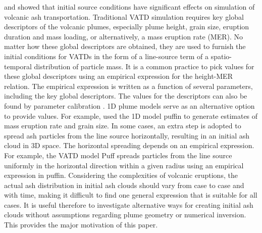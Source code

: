 \documentclass[utf8]{frontiersSCNS} %
\begin{document}
\citet{fero2009simulating} and \citet{stohl2011determination} showed that initial source conditions have significant effects on simulation of volcanic ash transportation. Traditional VATD simulation requires key global descriptors of the volcanic plumes, especially plume height, grain size, eruption duration and mass loading, or alternatively, a mass eruption rate (MER). No matter how these global descriptors are obtained, they are used to furnish the initial conditions for VATDs in the form of a line-source term of a spatio-temporal distribution of particle mass. It is a common practice to pick values for these global descriptors using an empirical expression for the height-MER relation. The empirical expression is written as a function of several parameters, including the key global descriptors. The values for the descriptors can also be found by parameter calibration \citep[e.g.][]{fero2008simulation,fero2009simulating, stohl2011determination, zidikheri2017estimation}. 1D plume models serve as an alternative option to provide values. For example, \citet{bursik2012estimation} used the 1D model puffin \citep{bursik2001effect} to generate estimates of mass eruption rate and grain size. In some cases, an extra step is adopted to spread ash particles from the line source horizontally, resulting in an initial ash cloud in 3D space. The horizontal spreading depends on an empirical expression. For example, the VATD model Puff spreads particles from the line source uniformly in the horizontal direction within a given radius using an empirical expression in puffin. Considering the complexities of volcanic eruptions, the actual ash distribution in initial ash clouds should vary from case to case and with time, making it difficult to find one general expression that is suitable for all cases. It is useful therefore to investigate alternative ways for creating initial ash clouds without assumptions regarding plume geometry or numerical inversion. This provides the major motivation of this paper.
\end{document}
